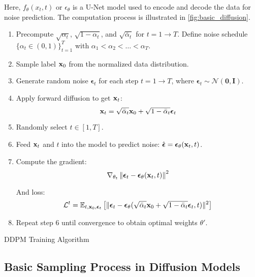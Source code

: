 Here, $f_{\theta}(x_t, t)$ or $\epsilon_\theta$ is a U-Net model used to encode and decode the data for noise prediction. The computation process is illustrated in \autoref{fig:basic_diffusion}.

\begin{algorithm}[h]
	\setlength{\baselineskip}{10pt}
	\begin{enumerate}
		\vspace{5pt}
		\item Precompute $\sqrt{\alpha_t}$, $\sqrt{1 - \alpha_t}$, and $\sqrt{\bar{\alpha}_t}$ for $t = 1 \rightarrow T$. Define noise schedule $\{\alpha_t \in (0, 1)\}_{t=1}^T$ with $\alpha_1 < \alpha_2 < \dots < \alpha_T$.
		
		\item Sample label $\mathbf{x}_0$ from the normalized data distribution.
		
		\item Generate random noise $\boldsymbol{\epsilon}_t$ for each step $t = 1 \rightarrow T$, where $\boldsymbol{\epsilon}_t \sim \mathcal{N}(\mathbf{0}, \mathbf{I})$.
		
		\item Apply forward diffusion to get $\mathbf{x}_t$:
		$$
		\mathbf{x}_t = \sqrt{\bar{\alpha}_t} \mathbf{x}_0 + \sqrt{1 - \bar{\alpha}_t} \boldsymbol{\epsilon}_t
		$$
		
		\item Randomly select $t \in [1, T]$.
		
		\item Feed $\mathbf{x}_t$ and $t$ into the model to predict noise: $\hat{\boldsymbol{\epsilon}} = \boldsymbol{\epsilon}_\theta(\mathbf{x}_t, t)$.
		
		\item Compute the gradient:
		$$
		\nabla_{\theta_t} \left\| \boldsymbol{\epsilon}_t - \boldsymbol{\epsilon}_\theta(\mathbf{x}_t, t) \right\|^2
		$$
		
		And loss:
		$$
		\mathcal{L}^t = \mathbb{E}_{t, \mathbf{x}_0, \boldsymbol{\epsilon}_t} \left[ \|\boldsymbol{\epsilon}_t - \boldsymbol{\epsilon}_\theta(\sqrt{\bar{\alpha}_t} \mathbf{x}_0 + \sqrt{1 - \bar{\alpha}_t} \boldsymbol{\epsilon}_t, t)\|^2 \right]
		$$
		
		\item Repeat step 6 until convergence to obtain optimal weights $\theta'$.
	\end{enumerate}
	\caption{DDPM Training Algorithm}
	\label{alg:TrainingDDPM}
\end{algorithm}

\subsection{Basic Sampling Process in Diffusion Models}

